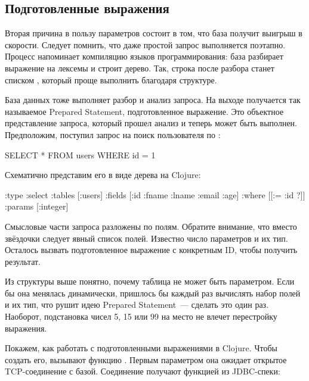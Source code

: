 \subsection{Подготовленные выражения}

Вторая причина в пользу параметров состоит в том, что база получит выигрыш в скорости. Следует помнить, что даже простой запрос выполняется поэтапно. Процесс напоминает компиляцию языков программирования: база разбирает выражение на лексемы и строит дерево. Так, строка  после разбора станет списком , который проще выполнить благодаря структуре.

База данных тоже выполняет разбор и анализ запроса. На выходе получается так называемое Prepared Statement, подготовленное выражение. Это объектное представление запроса, который прошел анализ и теперь может быть выполнен. Предположим, поступил запрос на поиск пользователя по :

\begin{english}
  \begin{sql}
SELECT * FROM users WHERE id = 1
  \end{sql}
\end{english}

Схематично представим его в виде дерева на Clojure:

\begin{english}
  \begin{clojure}
{:type :select
 :tables [:users]
 :fields [:id :fname :lname :email :age]
 :where [[:= :id ?]]
 :params [:integer]}
  \end{clojure}
\end{english}

Смысловые части запроса разложены по полям. Обратите внимание, что вместо звёздочки следует явный список полей. Известно число параметров и их тип. Осталось вызвать подготовленное выражение с конкретным ID, чтобы получить результат.

Из структуры выше понятно, почему таблица не может быть параметром. Если бы она менялась динамически, пришлось бы каждый раз вычислять набор полей и их тип, что рушит идею Prepared Statement~--- сделать это один раз. Наоборот, подстановка чисел 5, 15 или 99 на место  не влечет перестройку выражения.

Покажем, как работать с подготовленными выражениями в Clojure. Чтобы создать его, вызывают функцию . Первым параметром она ожидает открытое TCP-соединение с базой. Соединение получают функцией  из JDBC-спеки:

